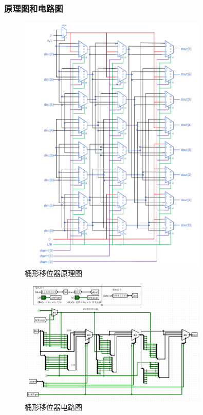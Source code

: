 \documentclass{article}
\begin{document}
    \subsubsection{原理图和电路图}
    \begin{figure}[H]
    \centering
    \includegraphics[width=0.8\textwidth]{6.4.1.png}
    \caption{桶形移位器原理图}
    \end{figure}

    \begin{figure}[H]
    \centering
    \includegraphics[width=0.8\textwidth]{6.4.2.png}
    \caption{桶形移位器电路图}
    \end{figure}
\end{document}

